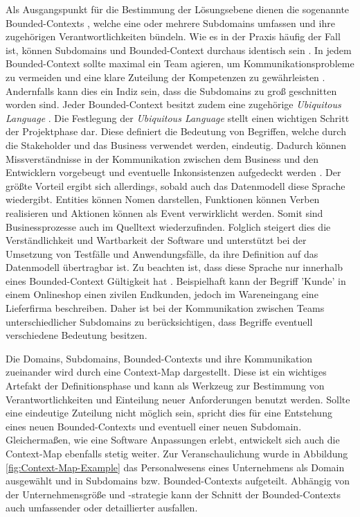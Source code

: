 Als Ausgangspunkt für die Bestimmung der Lösungsebene dienen die sogenannte Bounded-Contexts \cite[S. 57]{Vernon.2015}, welche eine oder mehrere Subdomains umfassen und ihre zugehörigen Verantwortlichkeiten bündeln. Wie es in der Praxis häufig der Fall ist, können Subdomains und Bounded-Context durchaus identisch sein \cite[S. 57]{Vernon.2015}. In jedem Bounded-Context sollte maximal ein Team agieren, um Kommunikationsprobleme zu vermeiden und eine klare Zuteilung der Kompetenzen zu gewährleisten \cite{Brandolini.2021}. Andernfalls kann dies ein Indiz sein, dass die Subdomains zu groß geschnitten worden sind. Jeder Bounded-Context besitzt zudem eine zugehörige \emph{Ubiquitous Language} \cite[S. 62]{Vernon.2015}. Die Festlegung der \emph{Ubiquitous Language} stellt einen wichtigen Schritt der Projektphase dar. Diese definiert die Bedeutung von Begriffen, welche durch die Stakeholder und das Business verwendet werden, eindeutig. Dadurch können Missverständnisse in der Kommunikation zwischen dem Business und den Entwicklern vorgebeugt und eventuelle Inkonsistenzen aufgedeckt werden \cite[S. 336f.]{Evans.2011}. Der größte Vorteil ergibt sich allerdings, sobald auch das Datenmodell diese Sprache wiedergibt. Entities können Nomen darstellen, Funktionen können Verben realisieren und Aktionen können als Event verwirklicht werden. Somit sind Businessprozesse auch im Quelltext wiederzufinden. Folglich steigert dies die Verständlichkeit und Wartbarkeit der Software \cite[S. 24ff.]{Evans.2011} und unterstützt bei der Umsetzung von Testfälle und Anwendungsfälle, da ihre Definition auf das Datenmodell übertragbar ist. Zu beachten ist, dass diese Sprache nur innerhalb eines Bounded-Context Gültigkeit hat \cite[S. 62]{Vernon.2015}. Beispielhaft kann der Begriff 'Kunde' in einem Onlineshop einen zivilen Endkunden, jedoch im Wareneingang eine Lieferfirma beschreiben. Daher ist bei der Kommunikation zwischen Teams unterschiedlicher Subdomains zu berücksichtigen, dass Begriffe eventuell verschiedene Bedeutung besitzen. 

Die Domains, Subdomains, Bounded-Contexts und ihre Kommunikation zueinander wird durch eine Context-Map dargestellt. Diese ist ein wichtiges Artefakt der Definitionsphase und kann als Werkzeug zur Bestimmung von Verantwortlichkeiten und Einteilung neuer Anforderungen benutzt werden. Sollte eine eindeutige Zuteilung nicht möglich sein, spricht dies für eine Entstehung eines neuen Bounded-Contexts und eventuell einer neuen Subdomain. Gleichermaßen, wie eine Software Anpassungen erlebt, entwickelt sich auch die Context-Map ebenfalls stetig weiter. Zur Veranschaulichung wurde in Abbildung \ref{fig:Context-Map-Example} das Personalwesens eines Unternehmens als Domain ausgewählt und in Subdomains bzw. Bounded-Contexts aufgeteilt. Abhängig von der Unternehmensgröße und -strategie kann der Schnitt der Bounded-Contexts auch umfassender oder detaillierter ausfallen.

